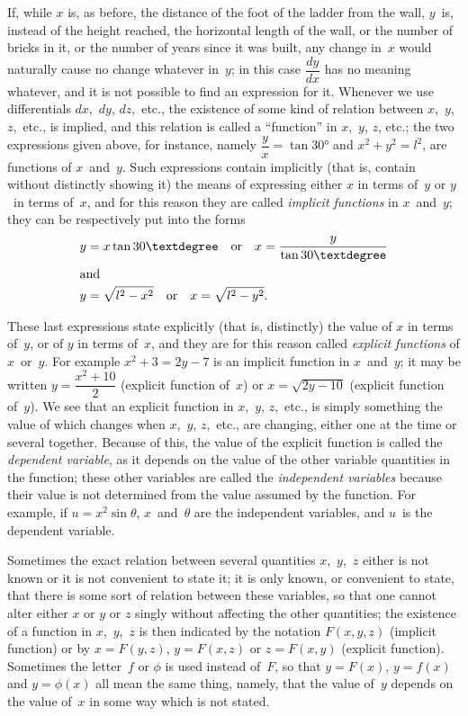 \documentclass[12pt]{book}[2005/09/16]
\newcommand{\DPPageSep}[2]{\Pagelabel{#2}}
\newcommand{\Pagelabel}[1]
  {\phantomsection\label{#1}}
\begin{document}
If, while $x$ is, as before, the distance of the foot
of the ladder from the wall, $y$~is, instead of the
height reached, the horizontal length of the wall, or
the number of bricks in it, or the number of years
since it was built, any change in~$x$ would naturally
cause no change whatever in~$y$; in this case $\dfrac{dy}{dx}$ has
no meaning whatever, and it is not possible to find
\DPPageSep{026.png}{14}%
an expression for it. Whenever we use differentials
$dx$,~$dy$, $dz$,~etc., the existence of some kind of
relation between $x$,~$y$, $z$,~etc., is implied, and this
relation is called a ``function''\Pagelabel{function} in $x$,~$y$, $z$, etc.; the
two expressions given above, for instance, namely
$\dfrac{y}{x} = \tan 30°$ and $x^2 + y^2 = l^2$, are functions of $x$~and~$y$.
Such expressions contain implicitly (that is, contain
without distinctly showing it) the means of expressing
either $x$ in terms of~$y$ or $y$~in terms of~$x$, and for
this reason they are called \emph{implicit functions} in
$x$~and~$y$; they can be respectively put into the forms
\begin{align*}
y &= x \tan 30° \quad\text{or}\quad x = \frac{y}{\tan 30°} \\
\intertext{and}
y &= \sqrt{ l^2 - x^2} \quad\text{or}\quad x = \sqrt{ l^2 - y^2}.
\end{align*}

These last expressions state explicitly (that is, distinctly)
the value of $x$ in terms of~$y$, or of $y$ in terms
of~$x$, and they are for this reason called \emph{explicit
functions} of $x$~or~$y$. For example $x^2 + 3 = 2y - 7$ is
an implicit function in $x$~and~$y$; it may be written
$y = \dfrac{x^2 + 10}{2}$ (explicit function of~$x$) or $x = \sqrt{2y - 10}$
(explicit function of~$y$). We see that an explicit
function in $x$,~$y$, $z$,~etc., is simply something the
value of which changes when $x$,~$y$, $z$,~etc., are
changing, either one at the time or several together.
Because of this, the value of the explicit function is
called the \emph{dependent variable}, as it depends on the
value of the other variable quantities in the function;
\DPPageSep{027.png}{15}%
these other variables are called the \emph{independent
variables}\Pagelabel{indvar} because their value is not determined from
the value assumed by the function. For example,
if $u = x^2 \sin \theta$, $x$~and~$\theta$ are the independent variables,
and $u$~is the dependent variable.

Sometimes the exact relation between several
quantities $x$,~$y$,~$z$ either is not known or it is not
convenient to state it; it is only known, or convenient
to state, that there is some sort of relation
between these variables, so that one cannot alter
either $x$ or $y$ or $z$ singly without affecting the other
quantities; the existence of a function in $x$,~$y$,~$z$ is
then indicated by the notation\Pagelabel{notation} $F(x, y, z)$ (implicit
function) or by $x = F(y, z)$, $y = F(x, z)$ or $z = F(x, y)$
(explicit function). Sometimes the letter~$f$ or $\phi$ is used
instead of~$F$, so that $y = F(x)$, $y = f(x)$ and $y = \phi(x)$
all mean the same thing, namely, that the value of~$y$
depends on the value of~$x$ in some way which is
not stated.
\end{document}

